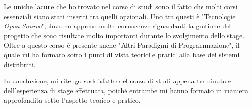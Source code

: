 Le uniche lacune che ho trovato nel corso di studi sono il fatto che molti corsi essenziali siano stati inseriti tra quelli opzionali. Uno tra questi è "Tecnologie \textit{Open Source}", dove ho appreso molte conoscenze riguardanti la gestione del progetto che sono risultate molto importanti durante lo svolgimento dello stage. Oltre a questo corso è presente anche "Altri Paradigmi di Programmazione", il quale mi ha formato sotto i punti di vista teorici e pratici alla base dei sistemi distribuiti.

In conclusione, mi ritengo soddisfatto del corso di studi appena terminato e dell'esperienza di stage effettuata, poiché entrambe mi hanno formato in maniera approfondita sotto l'aspetto teorico e pratico.
